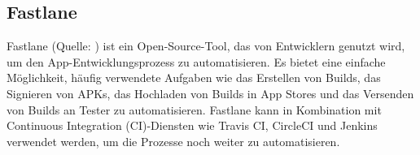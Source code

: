 

\subsection{Fastlane}

Fastlane (Quelle: \cite{fastlane} ) ist ein Open-Source-Tool, das von Entwicklern genutzt wird, um den App-Entwicklungsprozess zu automatisieren. Es bietet eine einfache Möglichkeit, häufig verwendete Aufgaben wie das Erstellen von Builds, das Signieren von APKs, das Hochladen von Builds in App Stores und das Versenden von Builds an Tester zu automatisieren. Fastlane kann in Kombination mit Continuous Integration (CI)-Diensten wie Travis CI, CircleCI und Jenkins verwendet werden, um die Prozesse noch weiter zu automatisieren.


